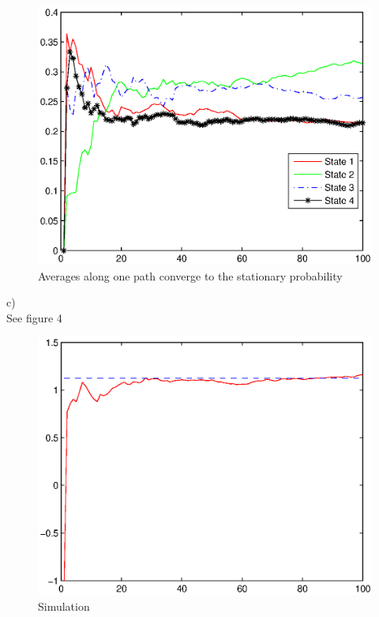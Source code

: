 \documentclass[12pt] {article}
\begin{document}
\begin{figure}
\begin{center}
\includegraphics[height=2.2 in] {hm2_prob2_b.eps}
\caption{Averages along one path converge to the stationary probability}
\end{center}
\end{figure}

c)\\
See figure 4

\begin{figure}
\begin{center}
\includegraphics[height=2.2 in] {hm2_prob2_c.eps}
\caption{Simulation}
\end{center}
\end{figure}
\end{document}
